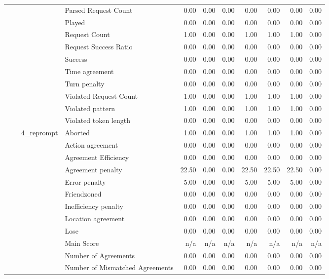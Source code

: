 \begin{tabular}{llllrrrrrrr}
 &  &  & Parsed Request Count & 0.00 & 0.00 & 0.00 & 0.00 & 0.00 & 0.00 & 0.00 \\
 &  &  & Played & 0.00 & 0.00 & 0.00 & 0.00 & 0.00 & 0.00 & 0.00 \\
 &  &  & Request Count & 1.00 & 0.00 & 0.00 & 1.00 & 1.00 & 1.00 & 0.00 \\
 &  &  & Request Success Ratio & 0.00 & 0.00 & 0.00 & 0.00 & 0.00 & 0.00 & 0.00 \\
 &  &  & Success & 0.00 & 0.00 & 0.00 & 0.00 & 0.00 & 0.00 & 0.00 \\
 &  &  & Time agreement & 0.00 & 0.00 & 0.00 & 0.00 & 0.00 & 0.00 & 0.00 \\
 &  &  & Turn penalty & 0.00 & 0.00 & 0.00 & 0.00 & 0.00 & 0.00 & 0.00 \\
 &  &  & Violated Request Count & 1.00 & 0.00 & 0.00 & 1.00 & 1.00 & 1.00 & 0.00 \\
 &  &  & Violated pattern & 1.00 & 0.00 & 0.00 & 1.00 & 1.00 & 1.00 & 0.00 \\
 &  &  & Violated token length & 0.00 & 0.00 & 0.00 & 0.00 & 0.00 & 0.00 & 0.00 \\
\cline{3-11}
 &  & \multirow[t]{27}{*}{4_reprompt} & Aborted & 1.00 & 0.00 & 0.00 & 1.00 & 1.00 & 1.00 & 0.00 \\
 &  &  & Action agreement & 0.00 & 0.00 & 0.00 & 0.00 & 0.00 & 0.00 & 0.00 \\
 &  &  & Agreement Efficiency & 0.00 & 0.00 & 0.00 & 0.00 & 0.00 & 0.00 & 0.00 \\
 &  &  & Agreement penalty & 22.50 & 0.00 & 0.00 & 22.50 & 22.50 & 22.50 & 0.00 \\
 &  &  & Error penalty & 5.00 & 0.00 & 0.00 & 5.00 & 5.00 & 5.00 & 0.00 \\
 &  &  & Friendzoned & 0.00 & 0.00 & 0.00 & 0.00 & 0.00 & 0.00 & 0.00 \\
 &  &  & Inefficiency penalty & 0.00 & 0.00 & 0.00 & 0.00 & 0.00 & 0.00 & 0.00 \\
 &  &  & Location agreement & 0.00 & 0.00 & 0.00 & 0.00 & 0.00 & 0.00 & 0.00 \\
 &  &  & Lose & 0.00 & 0.00 & 0.00 & 0.00 & 0.00 & 0.00 & 0.00 \\
 &  &  & Main Score & n/a & n/a & n/a & n/a & n/a & n/a & n/a \\
 &  &  & Number of Agreements & 0.00 & 0.00 & 0.00 & 0.00 & 0.00 & 0.00 & 0.00 \\
 &  &  & Number of Mismatched Agreements & 0.00 & 0.00 & 0.00 & 0.00 & 0.00 & 0.00 & 0.00 \\

\end{tabular}
